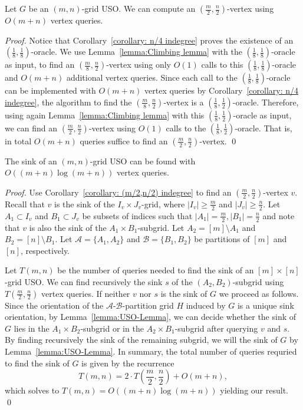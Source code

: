 \documentclass[runningheads,a4paper]{llncs}
\newcommand{\A}{\ensuremath{\mathcal A}}
\newcommand{\B}{\ensuremath{\mathcal B}}
\begin{document}
\begin{corollary}
Let $G$ be an $(m,n)$-grid USO. 
We can compute an $( \frac{m}{2}, \frac{n}{2})$-vertex using $O(m + n)$ vertex queries.
\end{corollary}
\begin{proof}
Notice that Corollary~\ref{corollary: n/4 indegree} proves the existence of an $( \frac{1}{8}, \frac{1}{8})$-oracle.
We use Lemma~\ref{lemma:Climbing lemma} with the $(\frac{1}{8}, \frac{1}{8})$-oracle as input, to find an $(\frac{m}{8}, \frac{n}{2})$-vertex using only $O(1)$ calls to this $(\frac{1}{8}, \frac{1}{8})$-oracle and $O(m+n)$ additional vertex queries. Since each call to the  $(\frac{1}{8}, \frac{1}{8})$-oracle can be implemented with $O(m+n)$ vertex queries by Corollary~\ref{corollary: n/4 indegree}, the algorithm to find the $(\frac{m}{8}, \frac{n}{2})$-vertex is a $(\frac{1}{8}, \frac{1}{2})$-oracle. 
Therefore, using again Lemma~\ref{lemma:Climbing lemma} with this $(\frac{1}{8}, \frac{1}{2})$-oracle as input, we can find an $(\frac{m}{2}, \frac{n}{2})$-vertex using $O(1)$ calls to the $(\frac{1}{8}, \frac{1}{2})$-oracle. That is, in total $O(m + n)$ queries suffice to find an $(\frac{m}{2}, \frac{n}{2})$-vertex. \qed
\end{proof}

\setcounter{theorem}{0}
\begin{theorem}
The sink of an $(m,n)$-grid USO can be found with \\ $O((m+n)\log (m+n))$ vertex queries.
\end{theorem}

\begin{proof}
Use Corollary~\ref{corollary: (m/2,n/2) indegree} to find an $(\frac{m}{2}, \frac{n}{2})$-vertex $v$. 
Recall that $v$ is the sink of the $I_v\times J_v$-grid, where $|I_v| \geq \frac{m}{2}$ and $|J_v|\geq \frac{n}{2}$. Let $A_1\subset I_v$ and $B_1\subset J_v$ be subsets of indices such that $|A_1| = \frac{m}{2}, |B_1| = \frac{n}{2}$ and note that $v$ is also the sink of the $A_1\times B_1$-subgrid.
Let $A_2= [m]\setminus A_1$ and $B_2 = [n]\setminus B_1$.
Let $\A = \{A_1, A_2\}$ and $\B = \{B_1, B_2\}$ be partitions of $[m]$ and $[n]$, respectively.

Let $T(m, n)$ be the number of queries needed to find the sink of an $[m]\times[n]$-grid USO.
We can find recursively the sink $s$ of the $(A_2, B_2)$-subgrid using $T(\frac{m}{2}, \frac{n}{2})$ vertex queries. 
If neither $v$ nor $s$ is the sink of $G$ we proceed as follows.
Since the orientation of the $\A$-$\B$-partition grid $H$ induced by $G$ is a unique sink orientation, by Lemma~\ref{lemma:USO-Lemma}, we can decide whether the sink of $G$ lies in the $A_1\times B_2$-subgrid or in the $A_2\times B_1$-subgrid after querying $v$ and $s$.
By finding recursively the sink of the remaining subgrid, we will the sink of $G$ by Lemma~\ref{lemma:USO-Lemma}. In summary, the total number of queries requried to find the sink of $G$ is given by the recurrence
$$T(m, n) = 2\cdot T\left(\frac{m}{2}, \frac{n}{2}\right) + O(m+n),$$
which solves to $T(m, n) = O((m+n) \log (m+n))$ yielding our result. \qed
\end{proof}
\end{document}
